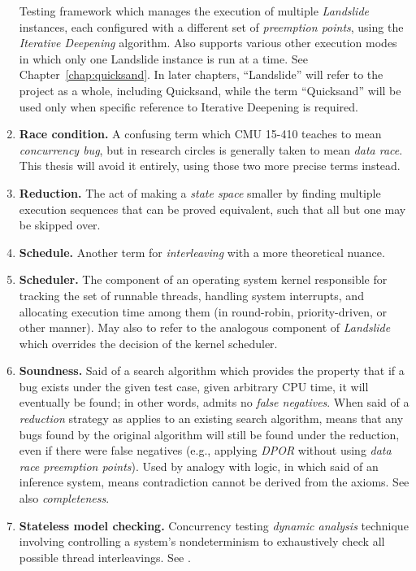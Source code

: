\begin{enumerate}
		Testing framework which manages the execution of multiple {\em Landslide} instances,
		each configured with a different set of {\em preemption points},
		using the {\em Iterative Deepening} algorithm.
		Also supports various other execution modes in which only one Landslide instance is run at a time.
		See Chapter~\ref{chap:quicksand}.
		In later chapters, ``Landslide'' will refer to the project as a whole, including Quicksand,
		while the term ``Quicksand'' will be used only when specific reference to Iterative Deepening is required.
	\item {\bf Race condition.}
		A confusing term which CMU 15-410 teaches to mean {\em concurrency bug},
		but in research circles is generally taken to mean {\em data race}.
		This thesis will avoid it entirely, using those two more precise terms instead.
	\item {\bf Reduction.}
		The act of making a {\em state space} smaller by finding multiple execution sequences that can be proved equivalent,
		such that all but one may be skipped over.
	\item {\bf Schedule.}
		Another term for {\em interleaving} with a more theoretical nuance.
	\item {\bf Scheduler.}
		The component of an operating system kernel responsible for tracking the set of runnable threads,
		handling system interrupts,
		and allocating execution time among them (in round-robin, priority-driven, or other manner).
		May also to refer to the analogous component of {\em Landslide}
		which overrides the decision of the kernel scheduler.
	\item {\bf Soundness.}
		Said of a search algorithm
		which provides the property that if a bug exists under the given test case,
		given arbitrary CPU time,
		it will eventually be found;
		in other words, admits no {\em false negatives}.
		When said of a {\em reduction} strategy as applies to an existing search algorithm,
		means that any bugs found by the original algorithm will still be found under the reduction,
		even if there were false negatives
		(e.g., applying {\em DPOR} without using {\em data race preemption points}).
		Used by analogy with logic, in which said of an inference system,
		means contradiction cannot be derived from the axioms.
		See also {\em completeness}.
	\item {\bf Stateless model checking.}
		Concurrency testing {\em dynamic analysis} technique involving controlling a system's nondeterminism
		to exhaustively check all possible thread interleavings.
		See \sect{\ref{sec:overview-stateless}}.

\end{enumerate}
